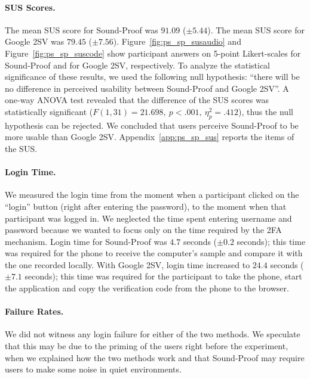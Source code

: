 \paragraph{SUS Scores.}
The mean SUS score for Sound-Proof was $91.09$ ($\pm 5.44$).
The mean SUS score for Google 2SV was $79.45$ ($\pm 7.56$).
Figure~\ref{fig:ps_sp_susaudio} and Figure~\ref{fig:ps_sp_suscode} show participant answers on 5-point Likert-scales for Sound-Proof and for Google 2SV, respectively. To analyze the statistical significance of these results, we used the following null hypothesis:
``there will be no difference in perceived usability between Sound-Proof and Google 2SV''.
A one-way ANOVA test revealed that the difference of the SUS scores was statistically significant
($F(1,31) = 21.698,\ p<.001,\ \eta_p^2 = .412$), thus the null hypothesis can be rejected.
We concluded that users perceive Sound-Proof to be more usable than Google 2SV.
Appendix~\ref{app:ps_sp_sus} reports the items of the SUS.

\paragraph{Login Time.}
We measured the login time from the moment when a participant clicked on the ``login'' button (right after entering the password),
to the moment when that participant was logged in.
We neglected the time spent entering username and password because we wanted to focus only on the time required by the 2FA mechanism.
Login time for Sound-Proof was $4.7$ seconds ($\pm 0.2$ seconds); this time was required for the phone to receive the computer's sample and compare it with the one recorded locally. %
With Google 2SV, login time increased to $24.4$ seconds ($\pm 7.1$ seconds); this time was required for the participant to take the phone, start the
application and copy the verification code from the phone to the browser.


\paragraph{Failure Rates.}
We did not witness any login failure for either of the two methods.
We speculate that this may be due to the priming of the users right before the experiment,
when we explained how the two methods work and that Sound-Proof may require users to make some noise in quiet environments.


